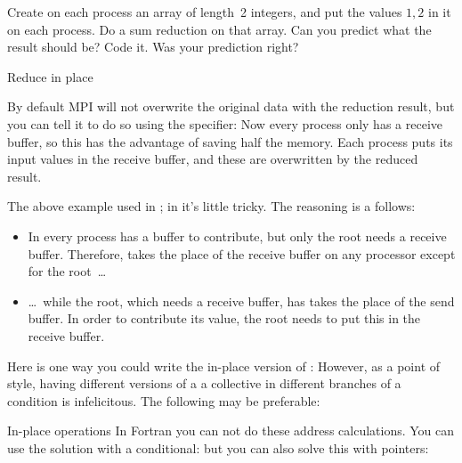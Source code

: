 \begin{exercise}
  \label{ex:randomcoord}
  Create on each process an array of length~2 integers, and put the
  values $1,2$ in it on each process. Do a sum reduction on that
  array. Can you predict what the result should be?  Code it. Was your
  prediction right?
\end{exercise}

 {Reduce in place}
\label{sec:allreduce-inplace}

By default MPI will not overwrite the original data with the reduction
result, but you can tell it to do so
using the  specifier:
%
%
Now every process only has a receive buffer, so this
has the advantage of saving half the memory.
Each process puts its input values in the receive buffer,
and these are overwritten by the reduced result.

The above example used  in
;
in  it's little  tricky.
The reasoning is a follows:
\begin{itemize}
\item In  every process has a buffer to
  contribute, but only the root needs a receive buffer. Therefore,
   takes the place of the receive buffer
  on any processor except for the root~\ldots
\item \dots~while the root, which needs a receive buffer,
  has  takes the place of the send buffer.
  In order to contribute its value, the root needs to put this in the
  receive buffer.
\end{itemize}

Here is one way you could write the in-place version of :
%
%
However, as a point of style, having different versions of a a collective
in different branches of a condition is infelicitous. The following may be preferable:
%

\begin{fortrannote}{In-place operations}
  In Fortran  you can not do these address calculations.
  You can use the solution with a conditional:
  but you can also solve this with pointers:
\end{fortrannote}

